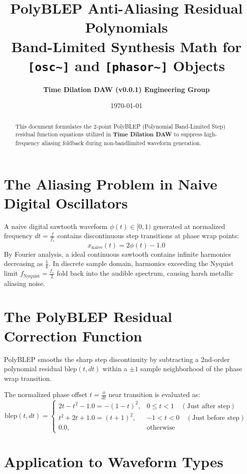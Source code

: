 \documentclass[11pt,a4paper]{article}
\title{\textbf{\Huge PolyBLEP Anti-Aliasing Residual Polynomials}\\[0.5em]
\Large Band-Limited Synthesis Math for \texttt{[osc\textasciitilde{}]} and \texttt{[phasor\textasciitilde{}]} Objects}
\author{\textbf{Time Dilation DAW (v0.0.1) Engineering Group}}
\date{\today}
\begin{document}
\maketitle

\begin{abstract}
This document formulates the 2-point PolyBLEP (Polynomial Band-Limited Step) residual function equations utilized in \textbf{Time Dilation DAW} to suppress high-frequency aliasing foldback during non-bandlimited waveform generation.
\end{abstract}

\section{The Aliasing Problem in Naive Digital Oscillators}
A naive digital sawtooth waveform $\phi(t) \in [0, 1)$ generated at normalized frequency $dt = \frac{f}{f_s}$ contains discontinuous step transitions at phase wrap points:
\begin{equation}
x_{\text{naive}}(t) = 2\phi(t) - 1.0
\end{equation}
By Fourier analysis, a ideal continuous sawtooth contains infinite harmonics decreasing as $\frac{1}{k}$. In discrete sample domain, harmonics exceeding the Nyquist limit $f_{\text{Nyquist}} = \frac{f_s}{2}$ fold back into the audible spectrum, causing harsh metallic aliasing noise.

\section{The PolyBLEP Residual Correction Function}
PolyBLEP smooths the sharp step discontinuity by subtracting a 2nd-order polynomial residual $\text{blep}(t, dt)$ within a $\pm 1$ sample neighborhood of the phase wrap transition.

The normalized phase offset $t = \frac{\phi}{dt}$ near transition is evaluated as:
\begin{equation}
\text{blep}(t, dt) =
\begin{cases}
2t - t^2 - 1.0 = -\left(1 - t\right)^2, & 0 \le t < 1 \quad (\text{Just after step}) \\
t^2 + 2t + 1.0 = (t + 1)^2, & -1 < t < 0 \quad (\text{Just before step}) \\
0.0, & \text{otherwise}
\end{cases}
\end{equation}

\section{Application to Waveform Types}
\end{document}
